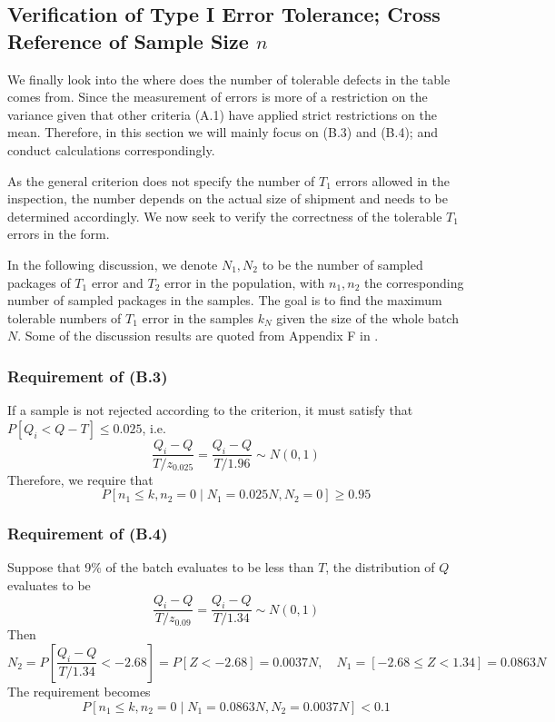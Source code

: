 \documentclass[12pt]{article}
\begin{document}
\subsection{Verification of Type I Error Tolerance; Cross Reference of Sample Size $n$}

We finally look into the where does the number of tolerable defects in the table comes from. Since the measurement of errors is more of a restriction on the variance given that other criteria (A.1) have applied strict restrictions on the mean. Therefore, in this section we will mainly focus on (B.3) and (B.4); and conduct calculations correspondingly.

As the general criterion does not specify the number of $T_1$ errors allowed in the inspection, the number depends on the actual size of shipment and needs to be determined accordingly. We now seek to verify the correctness of the tolerable $T_1$ errors in the form. 

In the following discussion, we denote $N_1, N_2$ to be the number of sampled packages of $T_1$ error and $T_2$ error in the population, with $n_1, n_2$ the corresponding number of sampled packages in the samples. The goal is to find the maximum tolerable numbers of $T_1$ error in the samples $k_{N}$ given the size of the whole batch $N$. Some of the discussion results are quoted from Appendix F in \cite{OIML2016}.

\subsubsection{Requirement of (B.3)}

If a sample is not rejected according to the criterion, it must satisfy that $P[Q_i < Q - T] \leq 0.025$, i.e. 
$$
\dfrac{Q_i - Q}{T/z_{0.025}} = \dfrac{Q_i - Q}{T/1.96}\sim N(0,1)
$$
Therefore, we require that
\begin{equation}\label{b3}
    P[n_1\leq k, n_2 = 0\mid N_1 = 0.025N, N_2 = 0] \geq 0.95
\end{equation}

\subsubsection{Requirement of (B.4)}

Suppose that 9\% of the batch evaluates to be less than $T$, the distribution of $Q$ evaluates to be
$$
\dfrac{Q_i - Q}{T/z_{0.09}} = \dfrac{Q_i - Q}{T/1.34}\sim N(0,1)
$$
Then 
$$
N_2 = P[\dfrac{Q_i - Q}{T/1.34} < -2.68] = P[Z < -2.68] = 0.0037N, \quad N_1 = [-2.68\leq Z < 1.34] = 0.0863N
$$
The requirement becomes
\begin{equation}\label{b4}
    P[n_1\leq k, n_2 = 0\mid N_1 = 0.0863N, N_2 = 0.0037N] < 0.1
\end{equation}
\end{document}
